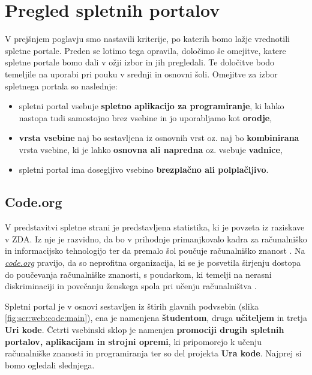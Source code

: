 \section{Pregled spletnih portalov}
\label{sec:pregled_spletnih_port}

V prejšnjem poglavju smo nastavili kriterije, po katerih bomo lažje
vrednotili spletne portale. Preden se lotimo tega opravila, določimo
še omejitve, katere spletne portale bomo dali v ožji izbor in jih
pregledali. Te določitve bodo temeljile na uporabi pri pouku v
srednji in osnovni šoli. Omejitve za izbor spletnega portala so
naslednje:

\begin{itemize}
  \tightlist
\item spletni portal vsebuje \textbf{spletno aplikacijo za
    programiranje}, ki lahko nastopa tudi samostojno brez vsebine
  in jo uporabljamo kot \textbf{orodje},
\item \textbf{vrsta vsebine} naj bo sestavljena iz osnovnih vrst
  oz. naj bo \textbf{kombinirana} vrsta vsebine, ki je lahko
  \textbf{osnovna ali napredna} oz. vsebuje
  \textbf{vadnice},
\item spletni portal ima dosegljivo vsebino \textbf{brezplačno ali polplačljivo}. 
\end{itemize}

\subsection{Code.org}
\label{sec:Code.org}

V predstavitvi spletne strani je predstavljena statistika, ki je
povzeta iz raziskave v ZDA. Iz nje je razvidno, da bo v prihodnje
primanjkovalo kadra za računalniško in informacijsko tehnologijo ter
da premalo šol poučuje računalniško znanost
\cite{web:code.org:promote}. Na
\emph{\href{https://code.org}{code.org}} \cite{web:code.org} pravijo,
da so neprofitna organizacija, ki se je posvetila širjenju dostopa do
poučevanja računalniške znanosti, s poudarkom, ki temelji na nerasni
diskriminaciji in povečanju ženskega spola pri učenju računalništva
\cite{web:code.org:about}.

Spletni portal je v osnovi sestavljen iz štirih glavnih podvsebin
(slika \ref{fig:scr:web:code:main}), ena je namenjena
\textbf{študentom}, druga \textbf{učiteljem} in tretja \textbf{Uri
  kode}. Četrti vsebinski sklop je namenjen \textbf{promociji drugih
  spletnih portalov, aplikacijam in strojni opremi}, ki pripomorejo k
učenju računalniške znanosti in programiranja ter so del projekta
\textbf{Ura kode}. Najprej si bomo ogledali slednjega.

